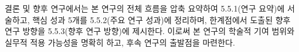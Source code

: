 
\section{}
\label{sec:conclusion-future-merged}

\begin{p5add}
결론 및 향후 연구에서는 본 연구의 전체 흐름을 압축 요약하여 5.5.1(연구 요약)에 서술하고,
핵심 성과 5개를 5.5.2(주요 연구 성과)에 정리하며, 한계점에서 도출된 향후 연구 방향을
5.5.3(향후 연구 방향)에 제시한다. 이로써 본 연구의 학술적 기여
범위와 실무적 적용 가능성을 명확히 하고, 후속 연구의 출발점을 마련한다.
\end{p5add}

\subsection{}
\label{subsec:conclusion-summary-merged}

\begingroup
  \renewcommand{\section}[1]{}
  
\endgroup

\subsection{}
\label{subsec:conclusion-achievements-merged}

\begingroup
  \renewcommand{\section}[1]{}
  \renewcommand{\subsection}[1]{\subsubsection{#1}}
  
\endgroup

\subsection{}
\label{subsec:conclusion-future-merged-future}

\begingroup
  \renewcommand{\section}[1]{}
  
\endgroup
